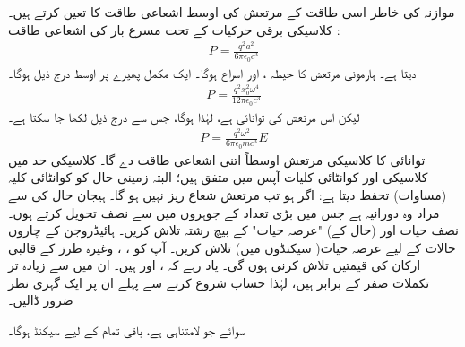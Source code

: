 موازنہ کی خاطر اسی طاقت کے   مرتعش کی  اوسط اشعاعی  طاقت کا  تعین کرتے ہیں۔ کلاسیکی برقی حرکیات کے تحت مسرع بار  کی  اشعاعی  طاقت  :
\begin{align}
	P = \frac{q^2a^2}{6\pi\epsilon_0c^3}
\end{align}
  دیتا ہے۔ ہارمونی مرتعش   کا حیطہ ،   اور  اسراع   ہوگا۔  ایک مکمل  پھیرے  پر   اوسط درج ذیل ہوگا۔
\begin{align*}
	P = \frac{q^2x^2_0\omega^4}{12\pi\epsilon_0c^3}
\end{align*}
لیکن اس مرتعش کی توانائی  ہے،  لہٰذا  ہوگا،  جس سے درج ذیل لکھا جا سکتا ہے۔
\begin{align}
	P = \frac{q^2\omega^2}{6\pi\epsilon_0mc^3}E
\end{align}
توانائی  کا کلاسیکی مرتعش اوسطاً اتنی اشعاعی  طاقت  دے گا۔ کلاسیکی حد  میں کلاسیکی اور کوانٹائی کلیات آپس میں متفق ہیں؛   البتہ زمینی حال کو کوانٹائی کلیہ
 (مساوات)   تحفظ  دیتا ہے: اگر  ہو تب مرتعش شعاع ریز نہیں ہو  گا۔
ہیجان حال کی    سے مراد وہ دورانیہ ہے جس میں بڑی تعداد کے جوہروں میں سے نصف تحویل کرتے ہوں۔ نصف حیات  اور  (حال کے)  "عرصہ حیات"     کے بیچ رشتہ تلاش کریں۔
ہائیڈروجن کے چاروں  حالات کے لیے عرصہ حیات(  سیکنڈوں میں) تلاش کریں۔   آپ کو  ،    ،  وغیرہ   طرز کے قالبی ارکان کی قیمتیں تلاش کرنی ہوں گی۔ یاد رہے کہ
 ،    اور   ہیں۔ ان میں سے زیادہ تر تکملات صفر کے برابر  ہیں، لہٰذا حساب شروع کرنے سے پہلے ان پر ایک گہری نظر ضرور ڈالیں۔

  سوائے  جو لامتناہی ہے،  باقی تمام کے لیے  سیکنڈ  ہوگا۔


